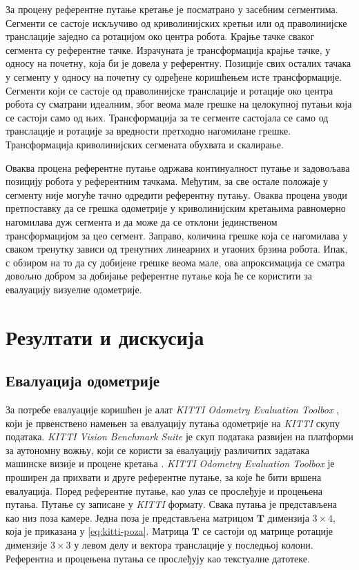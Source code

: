 \documentclass[12pt]{article}
\begin{document}
За процену референтне путање кретање је посматрано у засебним сегментима.
Сегменти се састоје искључиво од криволинијских кретњи или од праволинијске
транслације заједно са ротацијом око центра робота. Крајње тачке сваког
сегмента су референтне тачке. Израчуната је трансформација крајње тачке, у
односу на почетну, која би је довела у референтну. Позиције свих осталих тачака
у сегменту у односу на почетну су одређене коришћењем исте трансформације.
Сегменти који се састоје од праволинијске транслације и ротације око центра
робота су сматрани идеалним, због веома мале грешке на целокупној путањи која
се састоји само од њих. Трансформација за те сегменте састојала се само од
транслације и ротације за вредности претходно нагомилане грешке. Трансформација
криволинијских сегмената обухвата и скалирање.

Оваква процена референтне путање одржава континуалност путање и задовољава
позицију робота у референтним тачкама. Међутим, за све остале положаје у
сегменту није могуће тачно одредити референтну путању. Оваква процена уводи
претпоставку да се грешка одометрије у криволинијским кретањима равномерно
нагомилава дуж сегмента и да може да се отклони јединственом трансформацијом за
цео сегмент. Заправо, количина грешке која се нагомилава у сваком тренутку
зависи од тренутних линеарних и угаоних брзина робота. Ипак, с обзиром на то да
су добијене грешке веома мале, ова апроксимација се сматра довољно добром за
добијање референтне путање која ће се користити за евалуацију визуелне
одометрије.

\newpage

\section{Резултати и дискусија}
\subsection{Евалуација одометрије}
За потребе евалуације коришћен је алат \textit{KITTI Odometry Evaluation
	Toolbox} \cite{kitti_odom_eval, zhan2019dfvo}, који је првенствено намењен за
евалуацију путања одометрије на \textit{KITTI} скупу података. \textit{KITTI
	Vision Benchmark Suite} је скуп података развијен на платформи за аутономну
вожњу, који се користи за евалуацију различитих задатака машинске визије и
процене кретања \cite{kitti_benchmark}. \textit{KITTI Odometry Evaluation
	Toolbox} је проширен да прихвати и друге референтне путање, за које ће бити
вршена евалуација. Поред референтне путање, као улаз се прослеђује и процењена
путања. Путање су записане у \textit{KITTI} формату. Свака путања је
представљена као низ поза камере. Једна поза је представљена матрицом
$\mathbf{T}$ димензија $3 \times 4$, која је приказана у \eqref{eq:kitti-poza}.
Матрица $\mathbf{T}$ се састоји од матрице ротације димензије $3 \times 3$ у
левом делу и вектора транслације у последњој колони. Референтна и процењена
путања се прослеђују као текстуалне датотеке.
\end{document}
